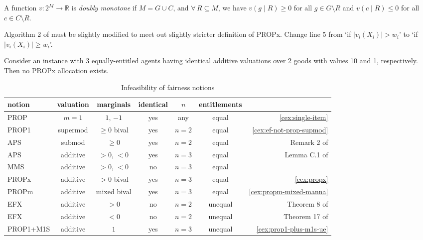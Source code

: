 \begin{table}[htb]
\footnotesize
\begin{tightenum}
\item \label{foot:dbl-mono}A function $v: 2^M \to \mathbb{R}$ is \emph{doubly monotone}
    if $M = G \cup C$, and $\forall\,R \subseteq M$,
    we have $v(g \mid R) \ge 0$ for all $g \in G \setminus R$
    and $v(c \mid R) \le 0$ for all $c \in C \setminus R$.
\item \label{foot:propx-li}Algorithm 2 of \cite{li2022almost} must be slightly modified
    to meet out slightly stricter definition of PROPx.
    Change line 5 from `if $|v_i(X_i)| > w_i$' to `if $|v_i(X_i)| \ge w_i$'.
\end{tightenum}
\end{table}

\begin{example}
\label{cex:propx}
Consider an instance with 3 equally-entitled agents having identical additive valuations over 2 goods
with values 10 and 1, respectively. Then no PROPx allocation exists.
\end{example}

\begin{table}[htb]
\centering
\caption{Infeasibility of fairness notions}
\label{table:infeas}
\begin{tabular}{lcccccr}
\toprule \scriptsize notion & \scriptsize valuation & \scriptsize marginals & \scriptsize identical & \scriptsize $n$ & \scriptsize entitlements &
\\ \midrule PROP & $m=1$ & $1$, $-1$ & yes & any & equal
    & \cref{cex:single-item}
\\[\defaultaddspace] PROP1 & supermod & $\ge 0$ bival & yes & $n=2$ & equal
    & \cref{cex:ef-not-prop-supmod}
\\[\defaultaddspace] APS & submod & $\ge 0$ & yes & $n=2$ & equal
    & Remark 2 of \cite{babaioff2023fair}
\\[\defaultaddspace] APS & additive & $> 0$, $< 0$ & yes & $n=3$ & equal
    & Lemma C.1 of \cite{babaioff2023fair}
\\[\defaultaddspace] MMS & additive & $> 0$, $< 0$ & no & $n=3$ & equal
    & \cite{feige2022tight}
\\[\defaultaddspace] PROPx & additive & $> 0$ bival & yes & $n=3$ & equal
    & \cref{cex:propx}
\\[\defaultaddspace] PROPm & additive & mixed bival & yes & $n=3$ & equal
    & \cref{cex:propm-mixed-manna}
\\[\defaultaddspace] EFX & additive & $> 0$ & no & $n=2$ & unequal
    & Theorem 8 of \cite{springer2024almost}
\\[\defaultaddspace] EFX & additive & $< 0$ & no & $n=2$ & unequal
    & Theorem 17 of \cite{springer2024almost}
\\[\defaultaddspace] PROP1+M1S & additive & $1$ & yes & $n=3$ & unequal
    & \cref{cex:prop1-plus-m1s-ue}
\\ \bottomrule
\end{tabular}
\end{table}
